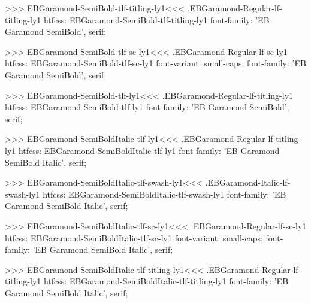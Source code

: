{{>>>
\<EBGaramond-SemiBold-tlf-titling-ly1\><<<
.EBGaramond-Regular-lf-titling-ly1
htfcss:  EBGaramond-SemiBold-tlf-titling-ly1  font-family: 'EB Garamond SemiBold', serif;

>>>
\<EBGaramond-SemiBold-tlf-sc-ly1\><<<
.EBGaramond-Regular-lf-sc-ly1
htfcss:  EBGaramond-SemiBold-tlf-sc-ly1  font-variant: small-caps; font-family: 'EB Garamond SemiBold', serif;

>>>
\<EBGaramond-SemiBold-tlf-ly1\><<<
.EBGaramond-Regular-lf-titling-ly1
htfcss:  EBGaramond-SemiBold-tlf-ly1  font-family: 'EB Garamond SemiBold', serif;

>>>
\<EBGaramond-SemiBoldItalic-tlf-ly1\><<<
.EBGaramond-Regular-lf-titling-ly1
htfcss:  EBGaramond-SemiBoldItalic-tlf-ly1  font-family: 'EB Garamond SemiBold Italic', serif;

>>>
\<EBGaramond-SemiBoldItalic-tlf-swash-ly1\><<<
.EBGaramond-Italic-lf-swash-ly1
htfcss:  EBGaramond-SemiBoldItalic-tlf-swash-ly1  font-family: 'EB Garamond SemiBold Italic', serif;

>>>
\<EBGaramond-SemiBoldItalic-tlf-sc-ly1\><<<
.EBGaramond-Regular-lf-sc-ly1
htfcss:  EBGaramond-SemiBoldItalic-tlf-sc-ly1  font-variant: small-caps; font-family: 'EB Garamond SemiBold Italic', serif;

>>>
\<EBGaramond-SemiBoldItalic-tlf-titling-ly1\><<<
.EBGaramond-Regular-lf-titling-ly1
htfcss:  EBGaramond-SemiBoldItalic-tlf-titling-ly1  font-family: 'EB Garamond SemiBold Italic', serif;

}}
